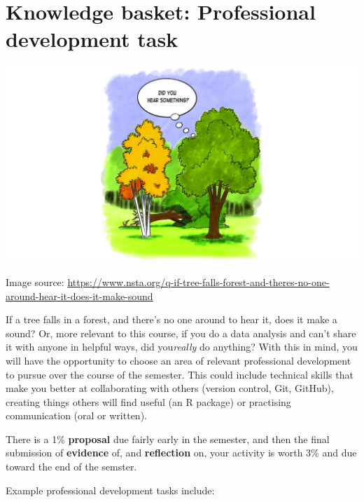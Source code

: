 \documentclass[
  openany]{book}
\begin{document}
\hypertarget{knowledge-basket-professional-development-task}{%
\chapter{Knowledge basket: Professional development task}\label{knowledge-basket-professional-development-task}}

\begin{center}\includegraphics[width=0.5\linewidth]{images/assessments/tree-sounds} \end{center}

Image source: \url{https://www.nsta.org/q-if-tree-falls-forest-and-theres-no-one-around-hear-it-does-it-make-sound}

If a tree falls in a forest, and there's no one around to hear it, does it make a sound? Or, more relevant to this course, if you do a data analysis and can't share it with anyone in helpful ways, did you\emph{really} do anything? With this in mind, you will have the opportunity to choose an area of relevant professional development to pursue over the course of the semester. This could include technical skills that make you better at collaborating with others (version control, Git, GitHub), creating things others will find useful (an R package) or practising communication (oral or written).

There is a 1\% \textbf{proposal} due fairly early in the semester, and then the final submission of \textbf{evidence} of, and \textbf{reflection} on, your activity is worth 3\% and due toward the end of the semster.

Example professional development tasks include:
\end{document}
